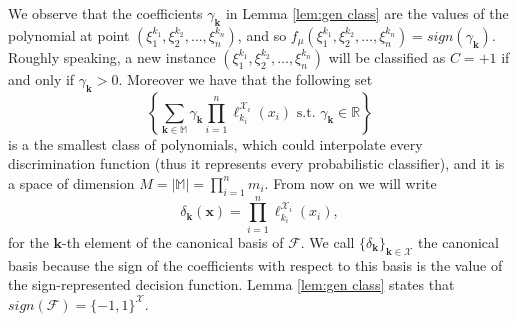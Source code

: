 \documentclass[11pt,a4paper, twoside]{book}
\newcommand{\bchi}{\boldsymbol{\mathcal{X}}}
\newcommand{\nchi}{\mathcal{X}}
\begin{document}
We observe that the coefficients $\gamma_{\mathbf{k}}$ in {Lemma \ref{lem:gen class}} are the values of the polynomial at  point $(\xi_1^{k_1},\xi_2^{k_2},\ldots,\xi_n^{k_n})$, and so $f_{\mu}(\xi_1^{k_1},\xi_2^{k_2},\ldots,\xi_n^{k_n})=sign(\gamma_{\mathbf{k}})$. 
Roughly speaking, a new instance $(\xi_1^{k_1},\xi_2^{k_2},\ldots,\xi_n^{k_n})$ will be classified as $C=+1$ if and only if $\gamma_{\mathbf{k}}>0$.
Moreover we have that the following set
\[ \left\{ \sum_{\mathbf{k}\in\mathbb{M}} \gamma_{\mathbf{k}} \prod_{i=1}^n \ell^{\nchi_i}_{k_i}(x_i) \text{ s.t. } \gamma_{\mathbf{k}}\in\mathbb{R} \right\} \] 
is a the smallest class of polynomials, which could interpolate every discrimination function (thus it represents every probabilistic classifier), and it is a space of dimension $M=|\mathbb{M}|=\prod_{i=1}^n m_i$. From now on we will write
\begin{equation}
\label{eq:canbase}
\delta_{\mathbf{k}}(\mathbf{x})=\prod_{i=1}^n \ell_{k_i}^{\nchi_i}(x_i),
\end{equation} 
for the $\mathbf{k}$-th element of the canonical basis of $\mathcal{F}$. We call  $\{ \delta_{\mathbf{k}} \}_{\mathbf{k} \in \bchi}$ the canonical basis because the sign of the coefficients with respect to this basis is the value of the sign-represented decision function. 
Lemma \ref{lem:gen class} states that $sign(\mathcal{F})=\{-1,1\}^{\bchi}$.
\end{document}
